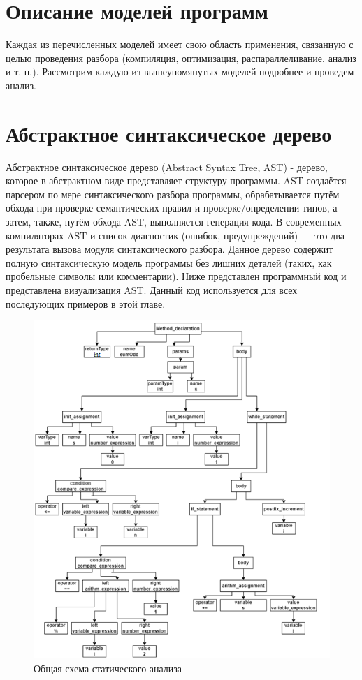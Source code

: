 \section{Описание моделей программ} \label{ch1:sec2}
Каждая из перечисленных моделей имеет свою область применения, связанную с целью проведения разбора (компиляция, оптимизация, распараллеливание, анализ и т. п.). Рассмотрим каждую из вышеупомянутых моделей подробнее и проведем анализ.
\section{Абстрактное синтаксическое дерево} \label{ch1:sec2-abbr}
Абстрактное синтаксическое дерево (Abstract Syntax Tree, AST) - дерево, которое в абстрактном виде представляет структуру программы. AST создаётся парсером по мере синтаксического разбора программы, обрабатывается путём обхода при проверке семантических правил и проверке/определении типов, а затем, также, путём обхода AST, выполняется генерация кода. В современных компиляторах AST и список диагностик (ошибок, предупреждений) — это два результата вызова модуля синтаксического разбора.
Данное дерево содержит полную синтаксическую модель программы без лишних деталей (таких, как пробельные символы или комментарии). Ниже представлен программный код и представлена визуализация AST. Данный код используется для всех последующих примеров в этой главе.

\begin{figure}[ht!] 
	\center
	\includegraphics [scale=1] {my_folder/images/my/2}
	\caption{Общая схема статического анализа } 
	\label{fig:2}  
\end{figure}
